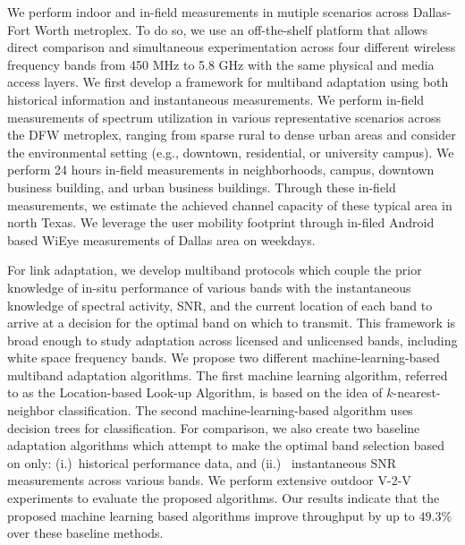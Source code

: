 We perform indoor and in-field measurements in mutiple scenarios across Dallas-Fort Worth 
metroplex.
To do so, we use an off-the-shelf platform that allows direct comparison and 
simultaneous experimentation across four different wireless frequency bands 
from 450 MHz to 5.8 GHz with the same physical and media access layers. 
We first develop a framework for multiband adaptation using both historical 
information and instantaneous measurements. 
We perform in-field 
measurements of spectrum utilization in various representative scenarios 
across the DFW metroplex, ranging from sparse rural to dense urban areas 
and consider the environmental setting (e.g., downtown, residential, or 
university campus). 
We perform 24 hours in-field measurements in neighborhoods, campus, downtown business building, 
and urban business buildings. Through these in-field measurements, we estimate the achieved channel capacity of 
these typical area in north Texas.
We leverage the user mobility footprint through in-filed Android based WiEye measurements of Dallas area on weekdays. 




For link adaptation, we develop multiband protocols 
which couple the prior knowledge of in-situ performance of various bands 
with the instantaneous knowledge of spectral activity, SNR, and the current 
location of each band to arrive at a decision for the optimal band on which to transmit. 
This framework is broad enough 
to study adaptation across licensed and unlicensed bands, including white 
space frequency bands. We propose two different machine-learning-based 
multiband adaptation algorithms. The first machine learning algorithm, 
referred to as the Location-based Look-up Algorithm, is based on the idea 
of $k$-nearest-neighbor classification. The second machine-learning-based 
algorithm uses decision trees for classification. For comparison, we also 
create two baseline adaptation algorithms which attempt to make the optimal
band selection based on only: (i.)~historical performance data, and (ii.)
~instantaneous SNR measurements across various bands. We perform extensive 
outdoor V-2-V experiments to evaluate the proposed algorithms. Our results 
indicate that the proposed machine learning based algorithms improve throughput 
by up to $49.3\%$ over these baseline methods.

